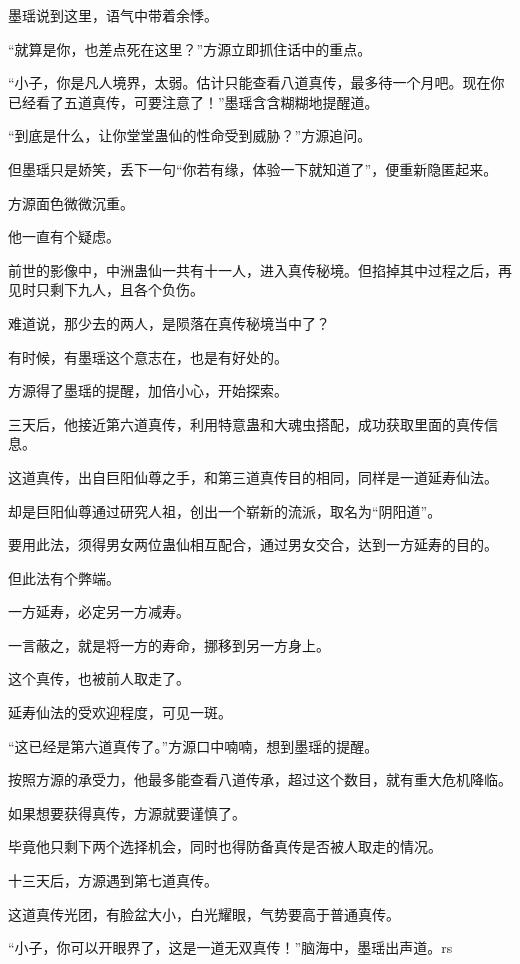 \begin{this_body}
墨瑶说到这里，语气中带着余悸。

“就算是你，也差点死在这里？”方源立即抓住话中的重点。

“小子，你是凡人境界，太弱。估计只能查看八道真传，最多待一个月吧。现在你已经看了五道真传，可要注意了！”墨瑶含含糊糊地提醒道。

“到底是什么，让你堂堂蛊仙的性命受到威胁？”方源追问。

但墨瑶只是娇笑，丢下一句“你若有缘，体验一下就知道了”，便重新隐匿起来。

方源面色微微沉重。

他一直有个疑虑。

前世的影像中，中洲蛊仙一共有十一人，进入真传秘境。但掐掉其中过程之后，再见时只剩下九人，且各个负伤。

难道说，那少去的两人，是陨落在真传秘境当中了？

有时候，有墨瑶这个意志在，也是有好处的。

方源得了墨瑶的提醒，加倍小心，开始探索。

三天后，他接近第六道真传，利用特意蛊和大魂虫搭配，成功获取里面的真传信息。

这道真传，出自巨阳仙尊之手，和第三道真传目的相同，同样是一道延寿仙法。

却是巨阳仙尊通过研究人祖，创出一个崭新的流派，取名为“阴阳道”。

要用此法，须得男女两位蛊仙相互配合，通过男女交合，达到一方延寿的目的。

但此法有个弊端。

一方延寿，必定另一方减寿。

一言蔽之，就是将一方的寿命，挪移到另一方身上。

这个真传，也被前人取走了。

延寿仙法的受欢迎程度，可见一斑。

“这已经是第六道真传了。”方源口中喃喃，想到墨瑶的提醒。

按照方源的承受力，他最多能查看八道传承，超过这个数目，就有重大危机降临。

如果想要获得真传，方源就要谨慎了。

毕竟他只剩下两个选择机会，同时也得防备真传是否被人取走的情况。

十三天后，方源遇到第七道真传。

这道真传光团，有脸盆大小，白光耀眼，气势要高于普通真传。

“小子，你可以开眼界了，这是一道无双真传！”脑海中，墨瑶出声道。rs

\end{this_body}

